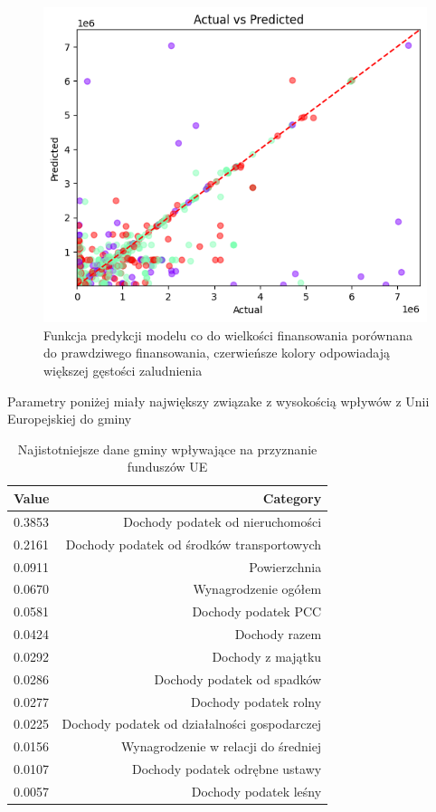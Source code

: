 \documentclass[12pt]{article}
\begin{document}
\begin{figure}[H]
\caption{Funkcja predykcji modelu co do wielkości finansowania porównana do prawdziwego finansowania, czerwieńsze kolory odpowiadają większej gęstości zaludnienia}
\centering
\includegraphics[width=1.0\textwidth]{output3.png}
\end{figure}
Parametry poniżej miały największy związake z wysokością wpływów z Unii Europejskiej do gminy

\begin{table}[H]
    \centering
    \begin{tabular}{lr}
    \toprule
    \textbf{Value} & \textbf{Category} \\
    \midrule
    0.3853 & Dochody podatek od nieruchomości \\
    0.2161 & Dochody podatek od środków transportowych \\
    0.0911 & Powierzchnia \\
    0.0670 & Wynagrodzenie ogółem \\
    0.0581 & Dochody podatek PCC \\
    0.0424 & Dochody razem \\
    0.0292 & Dochody z majątku \\
    0.0286 & Dochody podatek od spadków \\
    0.0277 & Dochody podatek rolny \\
    0.0225 & Dochody podatek od działalności gospodarczej \\
    0.0156 & Wynagrodzenie w relacji do średniej \\
    0.0107 & Dochody podatek odrębne ustawy \\
    0.0057 & Dochody podatek leśny \\
    \bottomrule
    \end{tabular}
    \caption{Najistotniejsze dane gminy wpływające na przyznanie funduszów UE}
    \end{table}
\end{document}
